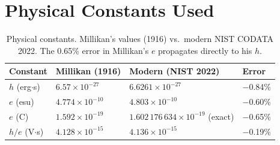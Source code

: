 \documentclass[12pt]{article}
\begin{document}
\section{Physical Constants Used}

\begin{table}[ht]
\centering
\caption{Physical constants.  Millikan's values (1916) vs.\ modern NIST CODATA
2022.  The 0.65\% error in Millikan's $e$ propagates directly to his $h$.}
\label{tab:constants}
\begin{tabular}{llll}
\toprule
Constant & Millikan (1916) & Modern (NIST 2022) & Error \\
\midrule
$h$ (erg$\cdot$s) & $6.57\times10^{-27}$ & $6.6261\times10^{-27}$ & $-$0.84\% \\
$e$ (esu) & $4.774\times10^{-10}$ & $4.803\times10^{-10}$ & $-$0.60\% \\
$e$ (C) & $1.592\times10^{-19}$ & $1.602\,176\,634\times10^{-19}$ (exact) & $-$0.65\% \\
$h/e$ (V$\cdot$s) & $4.128\times10^{-15}$ & $4.136\times10^{-15}$ & $-$0.19\% \\
\bottomrule
\end{tabular}
\end{table}
\end{document}
